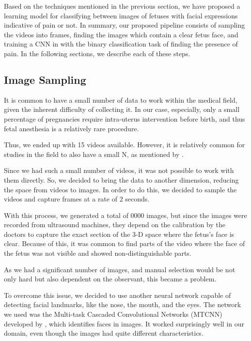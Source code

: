Based on the techniques mentioned in the previous section, we have proposed a learning model for classifying between images of fetuses with facial expressions indicative of pain or not. In summary, our proposed pipeline consists of sampling the videos into frames, finding the images which contain a clear fetus face, and training a CNN in with the binary classification task of finding the presence of pain. In the following sections, we describe each of these steps.

\subsection{Image Sampling}

It is common to have a small number of data to work within the medical field, given the inherent difficulty of collecting it. In our case, especially, only a small percentage of pregnancies require intra-uterus intervention before birth, and thus fetal anesthesia is a relatively rare procedure. 

Thus, we ended up with 15 videos available. However, it is relatively common for studies in the field to also have a small N, as mentioned by \cite{ZamzmiPGKSA16}.

Since we had such a small number of videos, it was not possible to work with them directly. So, we decided to bring the data to another dimension, reducing the space from videos to images. In order to do this, we decided to sample the videos and capture frames at a rate of 2 seconds. 

With this process, we generated a total of 0000 images, but since the images were recorded from ultrasound machines, they depend on the calibration by the doctors to capture the exact section of the 3-D space where the fetus's face is clear. Because of this, it was common to find parts of the video where the face of the fetus was not visible and showed non-distinguishable parts.

As we had a significant number of images, and manual selection would be not only hard but also dependent on the observant, this became a problem.

To overcome this issue, we decided to use another neural network capable of detecting facial landmarks, like the nose, the mouth, and the eyes. The network we used was the Multi-task Cascaded Convolutional Networks (MTCNN) developed by \cite{ZhangZL016}, which identifies faces in images. It worked surprisingly well in our domain, even though the images had quite different characteristics.

